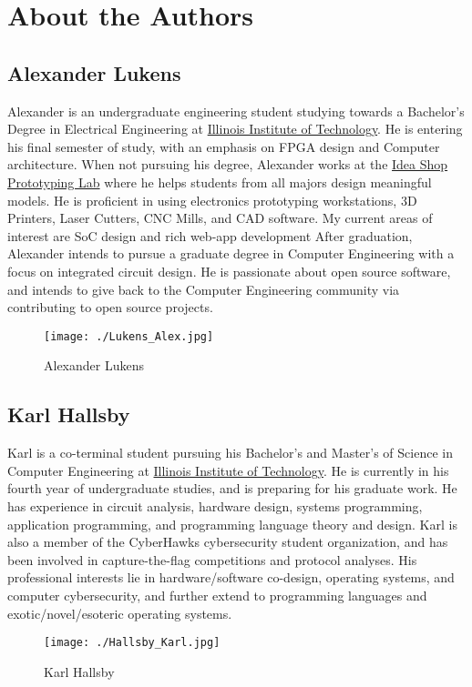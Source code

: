 \chapter{About the Authors}\label{chap:About_Authors}
\section*{Alexander Lukens}\label{sec:Alexander_Lukens}
Alexander is an undergraduate engineering student studying towards a Bachelor's Degree in Electrical Engineering at \href{https://www.iit.edu/}{Illinois Institute of Technology}. 
He is entering his final semester of study, with an emphasis on FPGA design and Computer architecture. 
When not pursuing his degree, Alexander works at the \href{https://wiki.ideashop.iit.edu/index.php?title=Main_Page}{Idea Shop Prototyping Lab} where he
helps students from all majors design meaningful models. He is proficient in using electronics prototyping workstations, 3D Printers, Laser Cutters, CNC Mills, and CAD software. My current areas of interest are SoC design and rich web-app development
After graduation, Alexander intends to pursue a graduate degree in Computer Engineering with a focus on integrated circuit design. He is passionate about open source software, and intends to give back to the Computer Engineering community via contributing to open source projects.
\begin{figure}[h!tbp]
  \centering
  \texttt{[image: ./Lukens\_Alex.jpg]}
  \caption*{Alexander Lukens}
  \label{fig:Alexander_Lukens}
\end{figure}

\section*{Karl Hallsby}\label{sec:Karl_Hallsby}
Karl is a co-terminal student pursuing his Bachelor's and Master's of Science in Computer Engineering at \href{https://www.iit.edu/}{Illinois Institute of Technology}.
He is currently in his fourth year of undergraduate studies, and is preparing for his graduate work.
He has experience in circuit analysis, hardware design, systems programming, application programming, and programming language theory and design.
Karl is also a member of the CyberHawks cybersecurity student organization, and has been involved in capture-the-flag competitions and protocol analyses.
His professional interests lie in hardware/software co-design, operating systems, and computer cybersecurity, and further extend to programming languages and exotic/novel/esoteric operating systems.

\begin{figure}[h!tbp]
  \centering
  \texttt{[image: ./Hallsby\_Karl.jpg]}
  \caption*{Karl Hallsby}
  \label{fig:Karl_Hallsby}
\end{figure}

